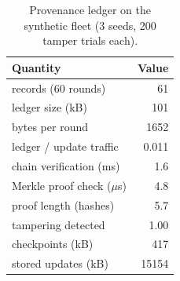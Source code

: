 \begin{table}[h]
\centering
\caption{Provenance ledger on the synthetic fleet (3 seeds, 200 tamper trials each).}\label{tab:s_ledger}
\footnotesize
\setlength{\tabcolsep}{3pt}
\begin{tabular}{@{}lr@{}}
\toprule
Quantity & Value \\
\midrule
records (60 rounds) & 61 \\
ledger size (kB) & 101 \\
bytes per round & 1652 \\
ledger / update traffic & 0.011 \\
chain verification (ms) & 1.6 \\
Merkle proof check ($\mu$s) & 4.8 \\
proof length (hashes) & 5.7 \\
tampering detected & 1.00 \\
checkpoints (kB) & 417 \\
stored updates (kB) & 15154 \\
\bottomrule
\end{tabular}
\end{table}

